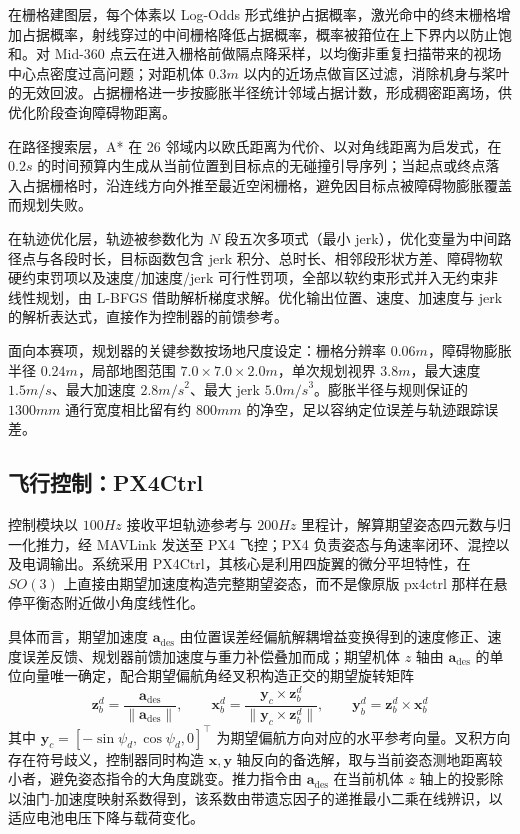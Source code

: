 在栅格建图层，每个体素以 Log-Odds 形式维护占据概率，激光命中的终末栅格增加占据概率，射线穿过的中间栅格降低占据概率，概率被箝位在上下界内以防止饱和。对 Mid-360 点云在进入栅格前做隔点降采样，以均衡非重复扫描带来的视场中心点密度过高问题；对距机体 $0.3\unit{m}$ 以内的近场点做盲区过滤，消除机身与桨叶的无效回波。占据栅格进一步按膨胀半径统计邻域占据计数，形成稠密距离场，供优化阶段查询障碍物距离。

在路径搜索层，A* 在 26 邻域内以欧氏距离为代价、以对角线距离为启发式，在 $0.2\unit{s}$ 的时间预算内生成从当前位置到目标点的无碰撞引导序列；当起点或终点落入占据栅格时，沿连线方向外推至最近空闲栅格，避免因目标点被障碍物膨胀覆盖而规划失败。

在轨迹优化层，轨迹被参数化为 $N$ 段五次多项式（最小 jerk），优化变量为中间路径点与各段时长，目标函数包含 jerk 积分、总时长、相邻段形状方差、障碍物软硬约束罚项以及速度/加速度/jerk 可行性罚项，全部以软约束形式并入无约束非线性规划，由 L-BFGS 借助解析梯度求解。优化输出位置、速度、加速度与 jerk 的解析表达式，直接作为控制器的前馈参考。

面向本赛项，规划器的关键参数按场地尺度设定：栅格分辨率 $0.06\unit{m}$，障碍物膨胀半径 $0.24\unit{m}$，局部地图范围 $7.0\times7.0\times2.0\unit{m}$，单次规划视界 $3.8\unit{m}$，最大速度 $1.5\unit{m/s}$、最大加速度 $2.8\unit{m/s}^2$、最大 jerk $5.0\unit{m/s}^3$。膨胀半径与规则保证的 $1300\unit{mm}$ 通行宽度相比留有约 $800\unit{mm}$ 的净空，足以容纳定位误差与轨迹跟踪误差。

\subsection{飞行控制：PX4Ctrl}

控制模块以 $100\unit{Hz}$ 接收平坦轨迹参考与 $200\unit{Hz}$ 里程计，解算期望姿态四元数与归一化推力，经 MAVLink 发送至 PX4 飞控；PX4 负责姿态与角速率闭环、混控以及电调输出。系统采用 PX4Ctrl，其核心是利用四旋翼的微分平坦特性，在 $SO(3)$ 上直接由期望加速度构造完整期望姿态，而不是像原版 px4ctrl 那样在悬停平衡态附近做小角度线性化。

具体而言，期望加速度 $\mathbf{a}_{\text{des}}$ 由位置误差经偏航解耦增益变换得到的速度修正、速度误差反馈、规划器前馈加速度与重力补偿叠加而成；期望机体 $z$ 轴由 $\mathbf{a}_{\text{des}}$ 的单位向量唯一确定，配合期望偏航角经叉积构造正交的期望旋转矩阵
\begin{equation}
\mathbf{z}_b^d = \frac{\mathbf{a}_{\text{des}}}{\|\mathbf{a}_{\text{des}}\|},\qquad
\mathbf{x}_b^d = \frac{\mathbf{y}_c\times\mathbf{z}_b^d}{\|\mathbf{y}_c\times\mathbf{z}_b^d\|},\qquad
\mathbf{y}_b^d = \mathbf{z}_b^d\times\mathbf{x}_b^d
\end{equation}
其中 $\mathbf{y}_c=[-\sin\psi_d,\cos\psi_d,0]^\top$ 为期望偏航方向对应的水平参考向量。叉积方向存在符号歧义，控制器同时构造 $\mathbf{x},\mathbf{y}$ 轴反向的备选解，取与当前姿态测地距离较小者，避免姿态指令的大角度跳变。推力指令由 $\mathbf{a}_{\text{des}}$ 在当前机体 $z$ 轴上的投影除以油门-加速度映射系数得到，该系数由带遗忘因子的递推最小二乘在线辨识，以适应电池电压下降与载荷变化。

